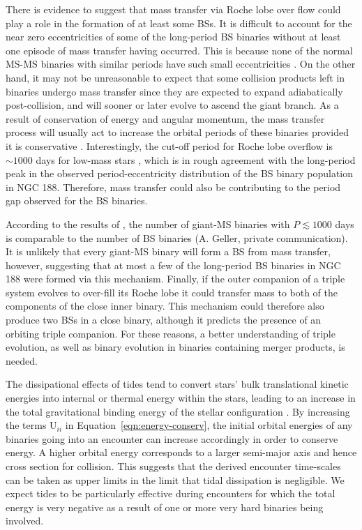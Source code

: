 There is evidence to suggest that mass transfer via Roche lobe
over flow could play a
role in the formation of at least some BSs.  It is difficult to account for 
the near zero eccentricities of some of the long-period BS binaries
without at least one episode of mass transfer having occurred. This is
because none of the normal MS-MS binaries with similar periods have
such small eccentricities \citep{mathieu09}.  On the other hand, it
may not be unreasonable to expect that some collision products left in
binaries undergo mass transfer since they are expected to expand
adiabatically post-collision, and will sooner or later evolve to
ascend the giant branch.  As a result of conservation
of energy and angular momentum, the mass transfer process will usually
act to 
increase the orbital periods of these binaries provided it is
conservative \citep{iben91}.  Interestingly, the cut-off period for
Roche lobe overflow is $\sim 1000$ days for low-mass stars
\citep{eggleton06}, which is in rough agreement with the long-period
peak in the observed period-eccentricity distribution of the BS binary
population in NGC 188.  Therefore, mass transfer could also be
contributing to the 
period gap observed for the BS binaries.  

According to the results of
\citet{geller09}, the number of giant-MS binaries with $P \lesssim
1000$ days is comparable to the
number of BS binaries (A. Geller, private communication).  It is unlikely that
every giant-MS binary will form a BS from mass transfer, however,
suggesting that at most a few of the long-period BS binaries in NGC
188 were formed via this mechanism.  Finally, if the outer
companion of a triple system evolves to
over-fill its Roche lobe it could transfer mass to both of the
components of the close inner binary.  This mechanism could therefore
also produce two BSs in a close binary, although it predicts the presence of
an orbiting triple companion.  For these reasons,
a better understanding of triple evolution, as well as binary
evolution in binaries containing merger products, is needed.

The dissipational effects of tides tend
to convert stars' bulk translational kinetic energies into internal or
thermal energy within the stars, leading to an increase in the total
gravitational binding energy of the stellar configuration
\citep[e.g.][]{mcmillan90}.  By
increasing the terms U$_{ii}$ in Equation~\ref{eqn:energy-conserv},
the initial orbital energies of any binaries going into an encounter
can increase accordingly in order to conserve energy.  A higher orbital energy
corresponds to a larger semi-major axis and hence cross section for
collision.  This suggests that the derived encounter time-scales can be
taken as upper limits in the limit that tidal dissipation is
negligible.  We expect tides to be particularly
effective during encounters for which the total energy is very
negative as a result of
one or more very hard binaries being involved.  

